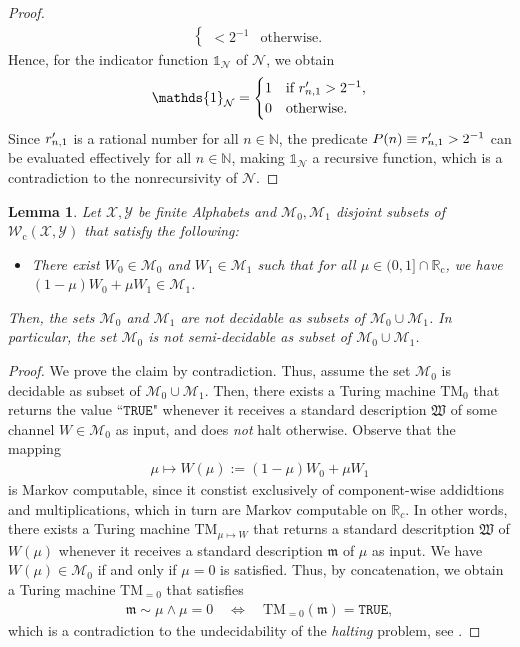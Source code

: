 \documentclass[conference]{IEEEtran}
\def\X{{\mathcal X}}
\def\Y{{\mathcal Y}}
\def\M{{\mathcal M}}
\def\N{{\mathcal N}}
\def\W{{\mathcal W}}
\def\NN{{\mathbb N}}
\def\RR{{\mathbb R}}
\newcommand{\RRc}{\RR_{\mathrm{c}}}
\newcommand{\TM}{\mathrm{TM}}
\newcommand{\rp}[1]{\mathrlap{\phantom{r}^{\prime}}r_{#1}}
\newcommand{\Wc}{\W_{\mathrm{c}}}
\newtheorem{Lemma}[Theorem]{Lemma}
\begin{document}
\begin{proof}
\begin{align}
\begin{cases}
																< 2^{-1} 	&\text{otherwise}.
												\end{cases} 
					\end{align}
					Hence, for the indicator function \(\mathds{1}_\N\) of \(\N\), we obtain
					\begin{align}	\mathds{1}_\N =		\begin{cases}	1	&\text{if}~\rp{n,1} > 2^{-1}, \\
																		0	&\text{otherwise}.
														\end{cases} 
					\end{align}
					Since \(\rp{n,1}\) is a rational number for all \(n\in\NN\), the predicate \(P(n) \equiv  \rp{n,1} > 2^{-1}\) can be
					evaluated effectively for all \(n\in\NN\), making \(\mathds{1}_\N\) a recursive function, which is a contradiction to the nonrecursivity of \(\N\).			
	\end{proof}
	\begin{Lemma}	\label{lem:SubsetNotSemidecidable}
					Let \(\X,\Y\) be finite Alphabets and \(\M_0, \M_1\) disjoint subsets of \(\Wc(\X,\Y)\) that satisfy the following:
					\begin{itemize}	\item There exist \(W_0\in\M_0\) and \(W_1\in\M_1\) such that for all \(\mu \in (0,1]\cap \RRc\), 													
										we have \((1-\mu)W_0 + \mu W_1 \in \M_1\). 
					\end{itemize}
					Then, the sets \(\M_0\) and \(\M_1\) are \emph{not} decidable as subsets of \(\M_0 \cup \M_1\). In particular, the set 
					\(\M_0\) is \emph{not} semi-decidable as subset of \(\M_0 \cup \M_1\).
	\end{Lemma}\begin{proof}
					We prove the claim by contradiction. Thus, assume the set \(\M_0\) is decidable as subset of \(\M_0 \cup \M_1\). 
					Then, there exists a Turing machine \(\TM_0\) that returns the value ``\(\mathtt{TRUE}\)" whenever it receives a standard description
					\(\mathfrak{W}\) of some channel \(W\in \M_0\) as input, and does \emph{not} halt otherwise. Observe that the mapping
					\begin{align}	\mu \mapsto W(\mu) := (1-\mu)W_0 + \mu W_1
					\end{align} 
					is Markov computable, since it constist exclusively of component-wise addidtions and multiplications, which in turn are Markov computable on \(\RR_c\).
					In other words, there exists a Turing machine \(\TM_{\mu\mapsto W}\) that returns a standard descritption \(\mathfrak{W}\) of 
					\(W(\mu)\) whenever it receives a standard description \(\mathfrak{m}\) of \(\mu\) as input. We have \(W(\mu) \in \M_0\) if and only if
					\(\mu = 0\) is satisfied. Thus, by concatenation, we obtain a Turing machine
					\(\TM_{=0}\) that satisfies
					\begin{align}	\mathfrak{m} \sim \mu \wedge \mu = 0	\quad\Leftrightarrow\quad  \TM_{=0}(\mathfrak{m}) = \mathtt{TRUE},
					\end{align}
					which is a contradiction to the undecidability of the \emph{halting} problem, see \cite{PoRi17}.
	\end{proof}
	
\end{document}
